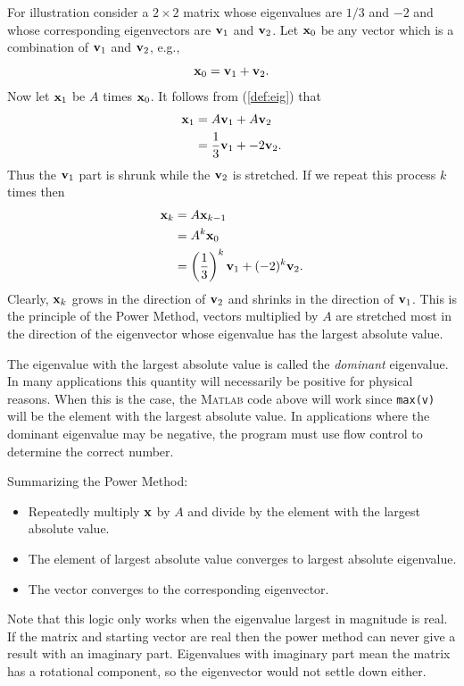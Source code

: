 For illustration consider a $2 \times 2$ matrix whose
eigenvalues are $1/3$ and $-2$ and whose corresponding eigenvectors
are $\mathbf{v}_1$ and $\mathbf{v}_2$.
Let $\mathbf{x}_0$ be any vector which is a combination of
$\mathbf{v}_1$ and $\mathbf{v}_2$, e.g.,
$$
     \mathbf{x}_0 = \mathbf{v}_1 + \mathbf{v}_2.
$$
Now let $\mathbf{x}_1$ be  $A$ times  $\mathbf{x}_0$. It follows from (\ref{def:eig}) that
\begin{equation}
\begin{split}
     \mathbf{x}_1 &= A \mathbf{v}_1 + A \mathbf{v}_2 \\
           &= \frac{1}{3} \mathbf{v}_1 +  -2 \mathbf{v}_2.
\end{split}
\end{equation}
Thus the $\mathbf{v}_1$ part is shrunk while the $\mathbf{v}_2$ is stretched.
If we repeat this process $k$ times then
\begin{equation}
\begin{split}
     \mathbf{x}_k &= A \mathbf{x}_{k-1} \\
           &= A^k \mathbf{x}_0 \\
           &= \left(\frac{1}{3}\right)^k \mathbf{v}_1 + (-2)^k \mathbf{v}_2.
\end{split}
\end{equation}
Clearly, $\mathbf{x}_k$ grows in the direction of $\mathbf{v}_2$ and
shrinks in the direction of $\mathbf{v}_1$. This is the principle
of the Power Method, vectors multiplied by $A$
are stretched most in the direction of the eigenvector  whose
eigenvalue has the largest absolute value.

The eigenvalue with the largest absolute value is called the {\em dominant}
eigenvalue. In many applications this quantity will necessarily be positive
for physical reasons. When this is the case, the \textsc{Matlab} code
above will work since \verb&max(v)& will be the element with the
largest absolute value. In applications where the dominant eigenvalue may be
negative, the program must use flow control to determine the correct
number.

Summarizing the Power Method:
\begin{itemize}
\item Repeatedly multiply $\mathbf{x}$ by $A$ and
  divide by the element with the largest absolute value.
\item The element of largest absolute value converges to largest absolute eigenvalue.
\item The vector converges to the corresponding eigenvector.
\end{itemize}
Note that this logic only works when the eigenvalue largest in
magnitude is real. If the matrix and starting vector are real then the
power method can never give a result with an imaginary part.
Eigenvalues with imaginary part mean the matrix has a rotational
component, so the eigenvector would not settle down either.

